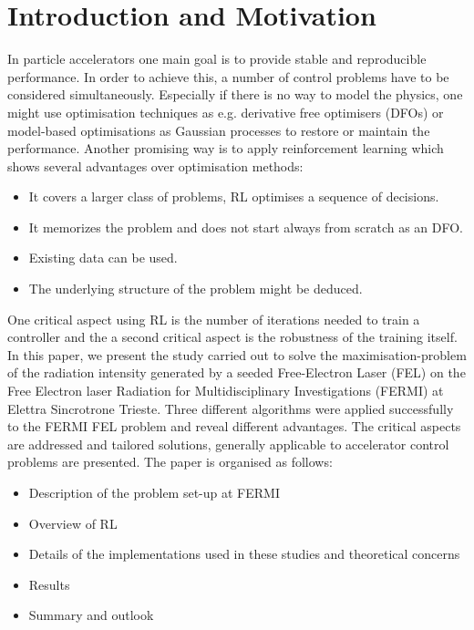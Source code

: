 \documentclass[
 reprint,
 amsmath,amssymb,amsfonts,clevref,
 aps,
prstab,
]{revtex4-2}
\begin{document}
\section{Introduction and Motivation}
In particle accelerators one main goal is to provide stable and reproducible performance. In order to achieve this, a number of control problems have to be considered simultaneously. Especially if there is no way to model the physics, one might use optimisation techniques as e.g. derivative free optimisers (DFOs) or model-based optimisations as Gaussian processes to restore or maintain the performance. Another promising way is to apply reinforcement learning which shows several advantages over optimisation methods:
\begin{itemize}
    \item It covers a larger class of problems, RL optimises a sequence of decisions.
    \item It memorizes the problem and does not start always from scratch as an DFO.
    \item Existing data can be used.
    \item The underlying structure of the problem might be deduced.
\end{itemize}
One critical aspect using RL is the number of iterations needed to train a controller and the a second critical aspect is the robustness of the training itself.\\
In this paper, we present the study carried out to solve the maximisation-problem of the radiation intensity generated by a seeded Free-Electron Laser (FEL) on the Free Electron laser Radiation for Multidisciplinary Investigations (FERMI) at Elettra Sincrotrone Trieste. Three different algorithms were applied successfully to the FERMI FEL problem and reveal different advantages. The critical aspects are addressed and tailored solutions, generally applicable to accelerator control problems are presented.
The paper is organised as follows:
\begin{itemize}
	\item Description of the problem set-up at FERMI
	\item Overview of RL
	\item Details of the implementations used in these studies and theoretical concerns
	\item Results 
	\item Summary and outlook
\end{itemize}
\end{document}
